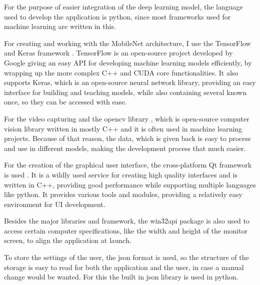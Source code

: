 \par For the purpose of easier integration of the deep learning model, the language used to develop the application is python, since most frameworks used for machine learning are written in this.
\par For creating and working with the MobileNet architecture, I use the TensorFlow \cite{tensorflow2015-whitepaper} and Keras framework \cite{chollet2015keras}. TensorFlow is an open-source project developed by Google giving an easy API for developing machine learning models efficiently, by wrapping up the more complex C++ and CUDA core functionalities. It also supports Keras, which is an open-source neural network library, providing an easy interface for building and teaching models, while also containing several known once, so they can be accessed with ease.
\par For the video capturing and the opencv library \cite{opencv_library}, which is open-source computer vision library written in mostly C++ and it is often used in machine learning projects. Because of that reason, the data, which is given back is easy to process and use in different models, making the development process that much easier.
\par For the creation of the graphical user interface, the cross-platform Qt framework is used \cite{QtPage}. It is a wildly used service for creating high quality interfaces and is written in C++, providing good performance while supporting multiple languages like python. It provides various tools and modules, providing a relatively easy environment for UI development.
\par Besides the major libraries and framework, the win32api package \cite{win32api} is also used to access certain computer specifications, like the width and height of the monitor screen, to align the application at launch.
\par To store the settings of the user, the json format is used, so the structure of the storage is easy to read for both the application and the user, in case a manual change would be wanted. For this the built in json library \cite{jsonlib} is used in python.
